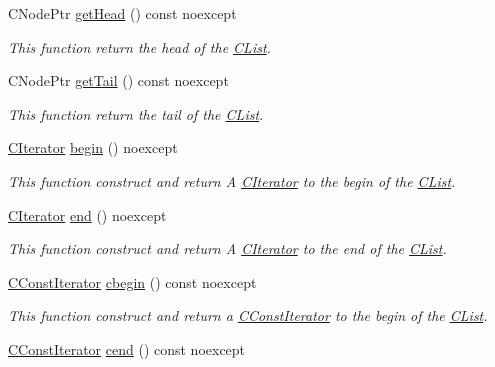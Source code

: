\begin{DoxyCompactItemize}
\item 
C\+Node\+Ptr \hyperlink{classnsSdD_1_1CList_ac196a16661fe4cba73b339a4e2fcfb73}{get\+Head} () const noexcept
\begin{DoxyCompactList}\small\item\em This function return the head of the \hyperlink{classnsSdD_1_1CList}{C\+List}. \end{DoxyCompactList}\item 
C\+Node\+Ptr \hyperlink{classnsSdD_1_1CList_a05c986208bf4f4a9ede4731df50ed8d0}{get\+Tail} () const noexcept
\begin{DoxyCompactList}\small\item\em This function return the tail of the \hyperlink{classnsSdD_1_1CList}{C\+List}. \end{DoxyCompactList}\item 
\hyperlink{structnsSdD_1_1CList_1_1CIterator}{C\+Iterator} \hyperlink{classnsSdD_1_1CList_aa388b52d241c12737c4e5b2a36c767c3}{begin} () noexcept
\begin{DoxyCompactList}\small\item\em This function construct and return A \hyperlink{structnsSdD_1_1CList_1_1CIterator}{C\+Iterator} to the begin of the \hyperlink{classnsSdD_1_1CList}{C\+List}. \end{DoxyCompactList}\item 
\hyperlink{structnsSdD_1_1CList_1_1CIterator}{C\+Iterator} \hyperlink{classnsSdD_1_1CList_ae1ed05415dfeb92174e030f9de754dc2}{end} () noexcept
\begin{DoxyCompactList}\small\item\em This function construct and return A \hyperlink{structnsSdD_1_1CList_1_1CIterator}{C\+Iterator} to the end of the \hyperlink{classnsSdD_1_1CList}{C\+List}. \end{DoxyCompactList}\item 
\hyperlink{structnsSdD_1_1CList_1_1CConstIterator}{C\+Const\+Iterator} \hyperlink{classnsSdD_1_1CList_a65cc2b6af1a489f45d2a3354c67fca39}{cbegin} () const noexcept
\begin{DoxyCompactList}\small\item\em This function construct and return a \hyperlink{structnsSdD_1_1CList_1_1CConstIterator}{C\+Const\+Iterator} to the begin of the \hyperlink{classnsSdD_1_1CList}{C\+List}. \end{DoxyCompactList}\item 
\hyperlink{structnsSdD_1_1CList_1_1CConstIterator}{C\+Const\+Iterator} \hyperlink{classnsSdD_1_1CList_a6fafea01ba64eb323ebe32e0eb6e6e6e}{cend} () const noexcept

\end{DoxyCompactItemize}
